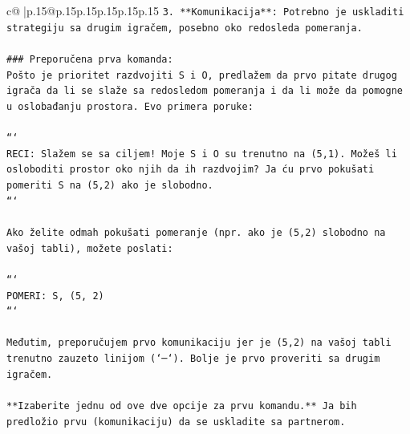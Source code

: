 \documentclass{article}
\begin{document}
{\begin{supertabular}{c@{$\;$}|p{.15\linewidth}@{}p{.15\linewidth}p{.15\linewidth}p{.15\linewidth}p{.15\linewidth}p{.15\linewidth}}
{{{\texttt{3. **Komunikacija**: Potrebno je uskladiti strategiju sa drugim igračem, posebno oko redosleda pomeranja.} \\
\\ 
\texttt{\#\#\# Preporučena prva komanda:} \\
\texttt{Pošto je prioritet razdvojiti S i O, predlažem da prvo pitate drugog igrača da li se slaže sa redosledom pomeranja i da li može da pomogne u oslobađanju prostora. Evo primera poruke:} \\
\\ 
\texttt{```} \\
\texttt{RECI: Slažem se sa ciljem! Moje S i O su trenutno na (5,1). Možeš li osloboditi prostor oko njih da ih razdvojim? Ja ću prvo pokušati pomeriti S na (5,2) ako je slobodno.} \\
\texttt{```} \\
\\ 
\texttt{Ako želite odmah pokušati pomeranje (npr. ako je (5,2) slobodno na vašoj tabli), možete poslati:} \\
\\ 
\texttt{```} \\
\texttt{POMERI: S, (5, 2)} \\
\texttt{```} \\
\\ 
\texttt{Međutim, preporučujem prvo komunikaciju jer je (5,2) na vašoj tabli trenutno zauzeto linijom (`─`). Bolje je prvo proveriti sa drugim igračem.} \\
\\ 
\texttt{**Izaberite jednu od ove dve opcije za prvu komandu.** Ja bih predložio prvu (komunikaciju) da se uskladite sa partnerom.} \\
            }
        }
    }
     \\ \\


\end{supertabular}}
\end{document}
